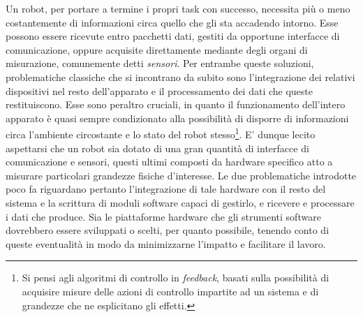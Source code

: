 \indent Un robot, per portare a termine i propri task con successo, necessita più o meno costantemente di informazioni circa quello che gli sta accadendo intorno. Esse possono essere ricevute entro pacchetti dati, gestiti da opportune interfacce di comunicazione, oppure acquisite direttamente mediante degli organi di misurazione, comunemente detti \emph{sensori}. Per entrambe queste soluzioni, problematiche classiche che si incontrano da subito sono l'integrazione dei relativi dispositivi nel resto dell'apparato e il processamento dei dati che queste restituiscono. Esse sono peraltro cruciali, in quanto il funzionamento dell'intero apparato è quasi sempre condizionato alla possibilità di disporre di informazioni circa l'ambiente circostante e lo stato del robot stesso\footnote{Si pensi agli algoritmi di controllo in \emph{feedback}, basati sulla possibilità di acquisire misure delle azioni di controllo impartite ad un sistema e di grandezze che ne esplicitano gli effetti.}. E' dunque lecito aspettarsi che un robot sia dotato di una gran quantità di interfacce di comunicazione e sensori, questi ultimi composti da hardware specifico atto a misurare particolari grandezze fisiche d'interesse. Le due problematiche introdotte poco fa riguardano pertanto l'integrazione di tale hardware con il resto del sistema e la scrittura di moduli software capaci di gestirlo, e ricevere e processare i dati che produce. Sia le piattaforme hardware che gli strumenti software dovrebbero essere sviluppati o scelti, per quanto possibile, tenendo conto di queste eventualità in modo da minimizzarne l'impatto e facilitare il lavoro.\newpage

